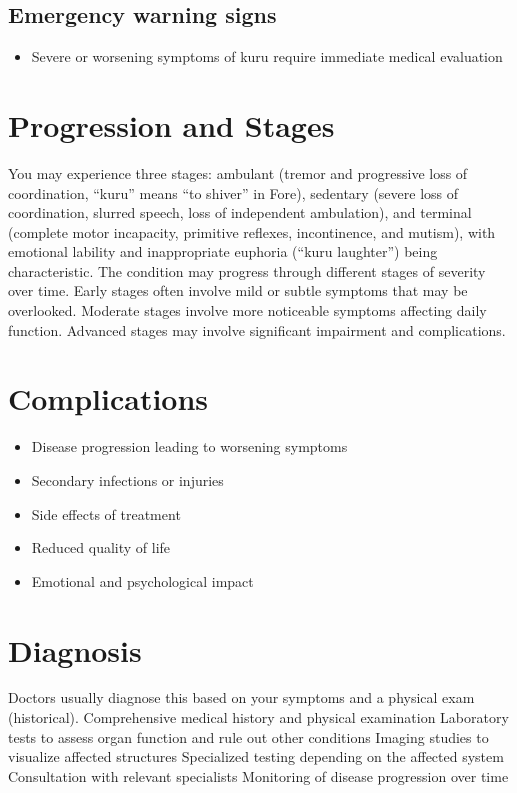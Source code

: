 \subsection{Emergency warning signs}
\begin{itemize}[noitemsep]
  \item Severe or worsening symptoms of kuru require immediate medical evaluation
\end{itemize}
\section{Progression and Stages}
You may experience three stages: ambulant (tremor and progressive loss of coordination, ``kuru'' means ``to shiver'' in Fore), sedentary (severe loss of coordination, slurred speech, loss of independent ambulation), and terminal (complete motor incapacity, primitive reflexes, incontinence, and mutism), with emotional lability and inappropriate euphoria (``kuru laughter'') being characteristic. The condition may progress through different stages of severity over time. Early stages often involve mild or subtle symptoms that may be overlooked. Moderate stages involve more noticeable symptoms affecting daily function. Advanced stages may involve significant impairment and complications.
\section{Complications}
\begin{itemize}[noitemsep]
  \item Disease progression leading to worsening symptoms
  \item Secondary infections or injuries
  \item Side effects of treatment
  \item Reduced quality of life
  \item Emotional and psychological impact
\end{itemize}
\section{Diagnosis}
Doctors usually diagnose this based on your symptoms and a physical exam (historical). Comprehensive medical history and physical examination Laboratory tests to assess organ function and rule out other conditions Imaging studies to visualize affected structures Specialized testing depending on the affected system Consultation with relevant specialists Monitoring of disease progression over time

